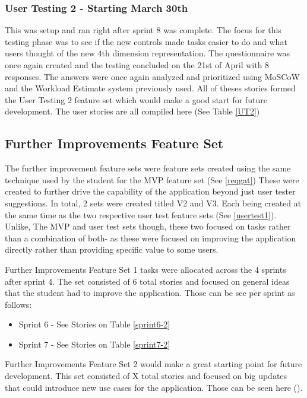 \subsubsection{User Testing 2 - Starting March 30th}
This was setup and ran right after sprint 8 was complete. The focus for this testing phase was to see if the new controls made tasks easier to do and what users thought of the new 4th dimension representation. The questionnaire was once again created and the testing concluded on the 21st of April with 8 responses. The answers were once again analyzed and prioritized using MoSCoW and the Workload Estimate system previously used. All of theses stories formed the User Testing 2 feature set which would make a good start for future development.
The user stories are all compiled here (See Table \ref{UT2})

\subsection{Further Improvements Feature Set}
The further improvement feature sets were feature sets created using the same technique used by the student for the MVP feature set (See \ref{reqgat}) These were created to further drive the capability of the application beyond just user tester suggestions. In total, 2 sets were created titled V2 and V3. Each being created at the same time as the two respective user test feature sets (See \ref{usertest1}). Unlike, The MVP and user test sets though, these two focused on tasks rather than a combination of both- as these were focused on improving the application directly rather than providing specific value to some users.

Further Improvements Feature Set 1 tasks were allocated across the 4 sprints after sprint 4. The set consisted of 6 total stories and focused on general ideas that the student had to improve the application. Those can be see per sprint as follows:

\begin{itemize}
    \item Sprint 6 - See Stories on Table \ref{sprint6-2}
    \item Sprint 7 - See Stories on Table \ref{sprint7-2}
\end{itemize}

Further Improvements Feature Set 2 would make a great starting point for future development. This set consisted of X total stories and focused on big updates that could introduce new use cases for the application. Those can be seen here ().